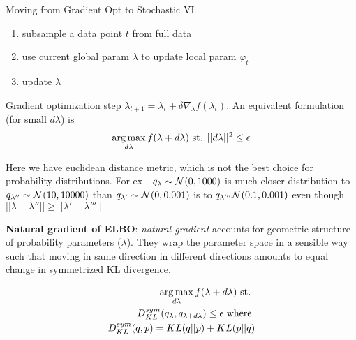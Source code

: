 \documentclass[summaries.tex]{subfiles}
\begin{document}
Moving from Gradient Opt to Stochastic VI
\begin{enumerate}
  \item subsample a data point $t$ from full data
  \item use current global param $\lambda$ to update local param $\varphi_t$
  \item update $\lambda$
\end{enumerate}

Gradient optimization step $\lambda_{t + 1} = \lambda_{t} + \delta\nabla_{\lambda}f(\lambda_{t})$.
An equivalent formulation (for small $d\lambda$) is
\begin{align}
  \operatorname*{arg\,max}_{d\lambda} f(\lambda + d\lambda) \text{ st. } ||d\lambda||^2 \leq \epsilon
\end{align}

Here we have euclidean distance metric, which is not the best choice for 
probability distributions. For ex - $q_{\lambda} \sim \mathcal{N}(0, 1000)$ is much closer
distribution to $q_{\lambda{''}} \sim \mathcal{N}(10, 10000)$ than $q_{\lambda{'}} \sim \mathcal{N}(0, 0.001)$
is to $q_{\lambda{'''}}\mathcal{N}(0.1, 0.001)$ even though $||\lambda - \lambda{''}|| \geq ||\lambda{'} - \lambda{'''}||$

{\bf Natural gradient of ELBO}: \emph{natural gradient} accounts for geometric
structure of probability parameters ($\lambda$). They wrap the parameter space
in a sensible way such that moving in same direction in different directions
amounts to equal change in symmetrized KL divergence.

\begin{align}
  \operatorname*{arg\,max}_{d\lambda} f(\lambda + d\lambda) \text{ st. } \\\nonumber
  D^{sym}_{KL}(q_{\lambda}, q_{\lambda + d\lambda}) \leq \epsilon \text{ where } \\\nonumber
  D^{sym}_{KL}(q, p) = KL(q||p) + KL(p||q)
\end{align}
\end{document}

